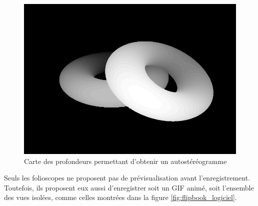 \begin{figure}[h]
	\centering
	\includegraphics[scale=0.3]{depth_logiciel.png}
	\caption{\label{fig:depthLogiciel} Carte des profondeurs permettant d'obtenir un autostéréogramme \protect}
\end{figure}


Seuls les folioscopes ne proposent pas de prévisualisation avant l'enregistrement. Toutefois, ils proposent eux aussi d'enregistrer soit un GIF animé, soit l'ensemble des vues isolées, comme celles montrées dans la figure \ref{fig:flipbook_logiciel}.

